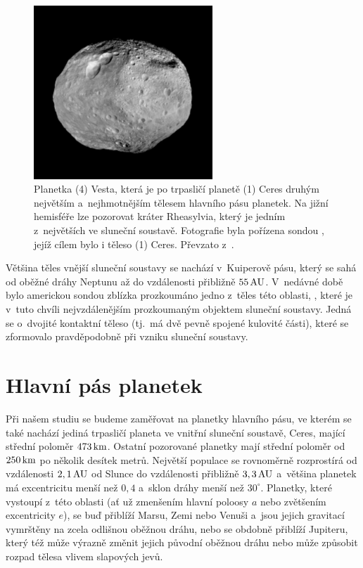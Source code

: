 \documentclass[A4paper, 12pt, oneside]{book}
\begin{document}
\begin{figure}
	\centering
	\includegraphics[width=0.6\textwidth]{obr/vesta.jpg}
	\caption{Planetka (4) Vesta, která je po trpasličí planetě (1) Ceres druhým největším a~nejhmotnějším tělesem hlavního pásu planetek. Na jižní hemisféře lze pozorovat kráter Rheasylvia, který je jedním z~největších ve sluneční soustavě. Fotografie byla pořízena sondou , jejíž cílem bylo i těleso (1) Ceres. Převzato z~\cite{jplvesta}.}
\end{figure}

Většina těles vnější sluneční soustavy se nachází v~Kuiperově pásu, který se sahá od oběžné dráhy Neptunu až do vzdálenosti přibližně $55\, {\rm AU}$. V~nedávné době bylo americkou sondou  zblízka prozkoumáno jedno z~těles této oblasti, , které je v~tuto chvíli nejvzdálenějším prozkoumaným objektem sluneční soustavy. Jedná se o~dvojité kontaktní těleso (tj.\ má dvě pevně spojené kulovité části), které se zformovalo pravděpodobně při vzniku sluneční soustavy.~\cite{ultimathule}


\pagebreak
\section{Hlavní pás planetek}
Při našem studiu se budeme zaměřovat na planetky hlavního pásu, ve kterém se také nachází jediná trpasličí planeta ve vnitřní sluneční soustavě, Ceres, mající střední poloměr $473\, {\rm km}$. Ostatní pozorované planetky mají střední poloměr od $250\, {\rm km}$ po několik desítek metrů. Největší populace se rovnoměrně rozprostírá od vzdálenosti $2,1\, {\rm AU}$ od Slunce do vzdálenosti přibližně $3,3\, {\rm AU}$ a~většina planetek má excentricitu menší než $0,4$ a~sklon dráhy menší než $30^\circ$. Planetky, které vystoupí z~této oblasti (ať už zmenšením hlavní poloosy $a$ nebo zvětšením excentricity $e$), se buď přiblíží Marsu, Zemi nebo Venuši a~jsou jejich gravitací vymrštěny na zcela odlišnou oběžnou dráhu, nebo se obdobně přiblíží Jupiteru, který též může výrazně změnit jejich původní oběžnou dráhu nebo může způsobit rozpad tělesa vlivem slapových jevů.
\end{document}
